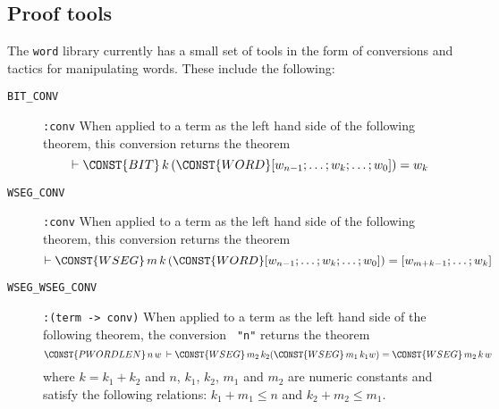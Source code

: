 \subsection{Proof tools}

The {\tt word} library currently has a small set of tools in the form
of conversions and tactics for manipulating words. These include the
following:
\begin{description}
\item[{\tt BIT\_CONV}] \verb|:conv| When applied to a term as the
left hand side of the following theorem, this conversion returns the theorem
\[
\THM \CONST{BIT}\,k\,(\CONST{WORD}[w_{n-1};\ldots;w_{k};\ldots;w_0]) = w_k
\]

\item[{\tt WSEG\_CONV}] \verb|:conv| When applied to a term as the
left hand side of the following theorem, this conversion returns the theorem
\[
\THM \CONST{WSEG}\,m\,k\,(\CONST{WORD}[w_{n-1};\ldots;w_{k};\ldots;w_0])
= [w_{m+k-1};\ldots; w_k]
\]

\item[{\tt WSEG\_WSEG\_CONV}] \verb|:(term -> conv)| When applied to a
term as the left hand side of the following theorem, the conversion 
{\tt {} "n"} returns the theorem 
\[
\CONST{PWORDLEN}\,n\,w\:\THM
\CONST{WSEG}\,m_2\,k_2(\CONST{WSEG}\,m_1\,k_1 w) = \CONST{WSEG}\,m_2\,k\,w
\]
where $k = k_1 + k_2$ and $n$, $k_1$, $k_2$, $m_1$ and $m_2$ are
numeric constants and satisfy the following relations: $k_1 + m_1\leq
n$ and $k_2 + m_2 \leq m_1$.


\end{description}
